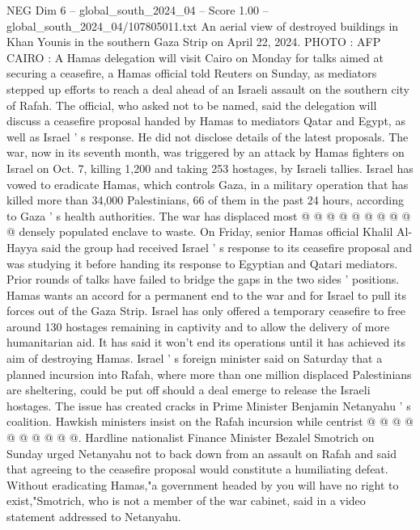 \begin{textsample}{NEG Dim 6 – global\_south\_2024\_04 – Score 1.00 – global\_south\_2024\_04/107805011.txt}  \label{ex:f6_neg_365}
An aerial view of destroyed buildings in Khan Younis in the southern Gaza Strip on April 22, 2024.
PHOTO : AFP CAIRO : A Hamas delegation will visit Cairo on Monday for talks aimed at securing a ceasefire, a Hamas official told Reuters on Sunday, as mediators stepped up efforts to reach a deal ahead of an Israeli assault on the southern city of Rafah.
The official, who asked not to be named, said the delegation will discuss a ceasefire proposal handed by Hamas to mediators Qatar and Egypt, as well as Israel ' s response.
He did not disclose details of the latest proposals.
The war, now in its seventh month, was triggered by an attack by Hamas fighters on Israel on Oct. 7, killing 1,200 and taking 253 hostages, by Israeli tallies.
Israel has vowed to eradicate Hamas, which controls Gaza, in a military operation that has killed more than 34,000 Palestinians, 66 of them in the past 24 hours, according to Gaza ' s health authorities.
The war has displaced most @ @ @ @ @ @ @ @ @ @ densely populated enclave to waste.
On Friday, senior Hamas official Khalil Al-Hayya said the group had received Israel ' s response to its ceasefire proposal and was studying it before handing its response to Egyptian and Qatari mediators.
Prior rounds of talks have failed to bridge the gaps in the two sides ' positions.
Hamas wants an accord for a permanent end to the war and for Israel to pull its forces out of the Gaza Strip.
Israel has only offered a temporary ceasefire to free around 130 hostages remaining in captivity and to allow the delivery of more humanitarian aid.
It has said it won't end its operations until it has achieved its aim of destroying Hamas.
Israel ' s foreign minister said on Saturday that a planned incursion into Rafah, where more than one million displaced Palestinians are sheltering, could be put off should a deal emerge to release the Israeli hostages.
The issue has created cracks in Prime Minister Benjamin Netanyahu ' s coalition.
Hawkish ministers insist on the Rafah incursion while centrist @ @ @ @ @ @ @ @ @ @.
Hardline nationalist Finance Minister Bezalel Smotrich on Sunday urged Netanyahu not to back down from an assault on Rafah and said that agreeing to the ceasefire proposal would constitute a humiliating defeat.
Without eradicating Hamas,"a government headed by you will have no right to exist,"Smotrich, who is not a member of the war cabinet, said in a video statement addressed to Netanyahu.

\end{textsample}
